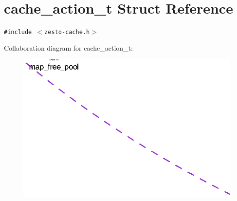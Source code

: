 \section{cache\_\-action\_\-t Struct Reference}
\label{structcache__action__t}
{\tt \#include $<$zesto-cache.h$>$}

Collaboration diagram for cache\_\-action\_\-t:\nopagebreak
\begin{figure}[H]
\begin{center}
\leavevmode
\includegraphics[width=400pt]{structcache__action__t__coll__graph}
\end{center}
\end{figure}
